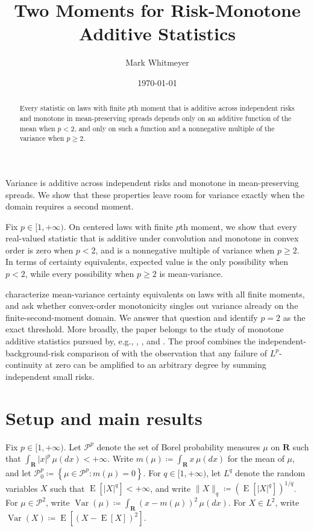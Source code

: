 \documentclass[11pt]{amsart}
\title[Two Moments for Risk-Monotone Additive Statistics]{Two Moments for Risk-Monotone Additive Statistics}
\author{Mark Whitmeyer}
\date{\today}
\theoremstyle{plain}
\theoremstyle{definition}
\theoremstyle{remark}
\numberwithin{equation}{section}
\newcommand{\1}{\mathbf 1}
\begin{document}
\begin{abstract}
Every statistic on laws with finite \(p\)th moment that is additive across independent risks and monotone in mean-preserving spreads depends only on an additive function of the mean when \(p<2\), and only on such a function and a nonnegative multiple of the variance when \(p\geq2\).
\end{abstract}

\maketitle

Variance is additive across independent risks and monotone in mean-preserving spreads. We show that these properties leave room for variance exactly when the domain requires a second moment.

Fix \(p\in[1,+\infty)\). On centered laws with finite \(p\)th moment, we show that every real-valued statistic that is additive under convolution and monotone in convex order is zero when \(p<2\), and is a nonnegative multiple of variance when \(p\geq2\). In terms of certainty equivalents, expected value is the only possibility when \(p<2\), while every possibility when \(p\geq2\) is mean-variance.

\citet{pomattoStrackTamuz2020} characterize mean-variance certainty equivalents on laws with all finite moments, and \citet{fritzMuTamuz2026} ask whether convex-order monotonicity singles out variance already on the finite-second-moment domain. We answer that question and identify \(p=2\) as the exact threshold. More broadly, the paper belongs to the study of monotone additive statistics pursued by, e.g., \citet{ruzsaSzekely1988}, \citet{mattner2004}, and \citet{muPomattoStrackTamuz2024}. The proof combines the independent-background-risk comparison of \citet{pomattoStrackTamuz2020} with the observation that any failure of \(L^p\)-continuity at zero can be amplified to an arbitrary degree by summing independent small risks.

\section{Setup and main results}

Fix \(p\in[1,+\infty)\). Let \(\mathcal P^p\) denote the set of Borel probability measures \(\mu\) on \(\mathbf R\) such that \(\int_{\mathbf R}|x|^p\,\mu(dx)<+\infty\). Write \(m(\mu)\coloneqq\int_{\mathbf R}x\,\mu(dx)\) for the mean of \(\mu\), and let \(\mathcal P_0^p\coloneqq\left\{\mu\in\mathcal P^p\colon m(\mu)=0\right\}\). For \(q\in[1,+\infty)\), let \(L^q\) denote the random variables \(X\) such that \(\operatorname{E}[|X|^q]<+\infty\), and write \(\lVert X\rVert_q\coloneqq\left(\operatorname{E}[|X|^q]\right)^{1/q}\). For \(\mu\in\mathcal P^2\), write \(\operatorname{Var}(\mu)\coloneqq\int_{\mathbf R}(x-m(\mu))^2\,\mu(dx)\). For \(X\in L^2\), write \(\operatorname{Var}(X)\coloneqq\operatorname{E}\left[\left(X-\operatorname{E}[X]\right)^2\right]\).
\end{document}
